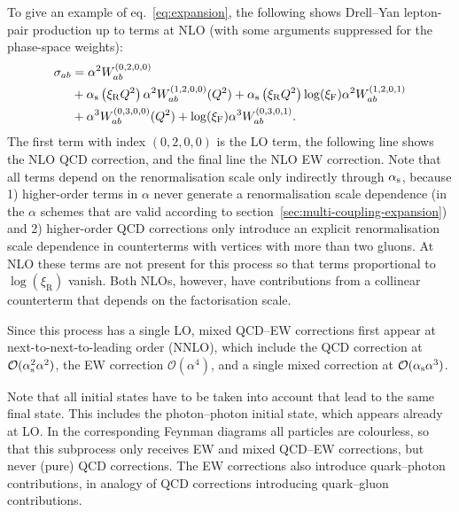 To give an example of eq.~\eqref{eq:expansion}, the following shows Drell--Yan lepton-pair production up to terms at NLO (with some arguments suppressed for the phase-space weights):
\begin{equation}
\begin{split}
\sigma_{ab}
    &= \alpha^2 W_{ab}^{(0,2,0,0)} \\
    &+ \alpha_\mathrm{s} \left( \xi_\mathrm{R} Q^2 \right) \alpha^2 W_{ab}^{(1,2,0,0)} (Q^2) + \alpha_\mathrm{s} \left( \xi_\mathrm{R} Q^2 \right) \log (\xi_\mathrm{F}) \alpha^2 W_{ab}^{(1,2,0,1)} \\
    &+ \alpha^3 W_{ab}^{(0,3,0,0)} (Q^2) + \log (\xi_\mathrm{F}) \alpha^3 W_{ab}^{(0,3,0,1)} \text{.}
\end{split}
\end{equation}
The first term with index $(0,2,0,0)$ is the LO term, the following line shows the NLO QCD correction, and the final line the NLO EW correction.
Note that all terms depend on the renormalisation scale only indirectly through $\alpha_\mathrm{s}$, because 1) higher-order terms in $\alpha$ never generate a renormalisation scale dependence (in the $\alpha$ schemes that are valid according to section~\ref{sec:multi-coupling-expansion}) and 2) higher-order QCD corrections only introduce an explicit renormalisation scale dependence in counterterms with vertices with more than two gluons.
At NLO these terms are not present for this process so that terms proportional to $\log (\xi_\mathrm{R})$ vanish.
Both NLOs, however, have contributions from a collinear counterterm that depends on the factorisation scale.

Since this process has a single LO, mixed QCD--EW corrections first appear at next-to-next-to-leading order (NNLO), which include the QCD correction at $\mathcal{O} (\alpha_\mathrm{s}^2 \alpha^2)$, the EW correction $\mathcal{O} (\alpha^4)$, and a single mixed correction at $\mathcal{O} (\alpha_\mathrm{s} \alpha^3)$.

Note that all initial states have to be taken into account that lead to the same final state.
This includes the photon--photon initial state, which appears already at LO.
In the corresponding Feynman diagrams all particles are colourless, so that this subprocess only receives EW and mixed QCD--EW corrections, but never (pure) QCD corrections.
The EW corrections also introduce quark--photon contributions, in analogy of QCD corrections introducing quark--gluon contributions.


